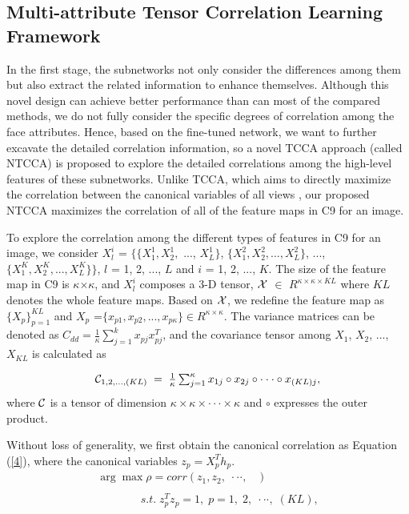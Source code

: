\documentclass{sig-alternate-05-2015}
\begin{document}
\subsection{Multi-attribute Tensor Correlation Learning Framework}
In the first stage, the subnetworks not only consider the differences among them but also extract the related information to enhance themselves. Although this novel design can achieve better performance than can most of the compared methods, we do not fully consider the specific degrees of correlation among the face attributes. Hence, based on the fine-tuned network, we want to further excavate the detailed correlation information, so a novel TCCA approach (called NTCCA) is proposed to explore the detailed correlations among the high-level features of these subnetworks. Unlike TCCA, which aims to directly maximize the correlation between the canonical variables of all views \cite{Luo2015Tensor}, our proposed NTCCA maximizes the correlation of all of the feature maps in C9 for an image.


To explore the correlation among the different types of features in C9 for an image, we consider ${X_l^i}$ = $\{\{X_1^1, X_2^1,$ ..., $X_L^1\}$, $\{X_1^2, X_2^2, ..., X_L^2\}$, ..., $\{X_1^K, X_2^K, ..., X_L^K\}\}$, $l$ = 1, 2, ..., $L$ and $i$ = 1, 2, ..., $K$. The size of the feature map in C9 is $\kappa$$\times$$\kappa$, and ${X_l^i}$ composes a 3-D tensor, $\cal{X}$ $\in$ $R^{\kappa\times\kappa\times KL}$ where $KL$ denotes the whole feature maps. Based on $\cal{X}$, we redefine the feature map as $\{X_p\}_{p=1}^{KL}$ and ${X_p}$ =$\{x_{p1}, x_{p2}, ..., x_{p\kappa}\} \in R^{\kappa\times\kappa}$. The variance matrices can be denoted as ${ C_{dd}} = \frac{1}{{{\kappa}}}\sum\nolimits_{j = 1}^{{k}} {{x_{pj}}x_{pj}^T}$, and the covariance tensor among $X_{1}$, $X_{2}$, ..., $X_{KL}$ is calculated as


\begin{equation}\label{414}
\begin{array}{l}
{ {\cal C}_{1,2, ..., (KL)}}\; = \;\frac{1}{\kappa}\sum\nolimits_{j = 1}^{\kappa} {{x_{1j}}}  \circ {x_{2j}} \circ \cdot \cdot \cdot \circ {x_{(KL)j}},
\end{array}
\end{equation}
where ${\cal C}$ is a tensor of dimension ${\kappa} \times {\kappa} \times \cdot \cdot \cdot \times {\kappa}$ and $\circ$ expresses the outer product.

Without loss of generality, we first obtain the canonical correlation as Equation (\ref{4}), where the canonical variables ${z_p} = X_p^T{h_p}$.
\begin{equation}\label{4}
\begin{array}{l}
\arg \max \rho  = corr({z_1},{z_2}, \; \cdot  \cdot  \cdot, \;\mathop  {z_{KL}})\\
\\
\;\;\;\;\;\;\;\;\;\;\;\;\;\;s.t.\;z_p^T{z_p} = 1,\;p = 1,\;2,\; \cdot  \cdot  \cdot, \;(KL),
\end{array}
\end{equation}
\end{document}
